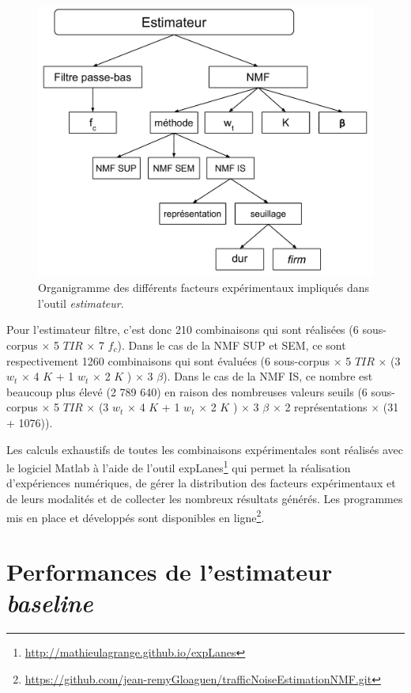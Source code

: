 \begin{figure}[h]
\centering
\includegraphics[width=0.8\linewidth]{./figures/NMF/facteurs_exp.pdf}
\caption{Organigramme des différents facteurs expérimentaux impliqués dans l'outil \textit{estimateur}.}
\label{fig:organigramme}
\end{figure}

Pour l'estimateur filtre, c'est donc 210 combinaisons qui sont réalisées (6 sous-corpus $\times$ 5 $TIR$ $\times$ 7 $f_c$). Dans le cas de la NMF SUP et SEM, ce sont respectivement 1260 combinaisons qui sont évaluées (6 sous-corpus $\times$ 5 $TIR$ $\times$ (3 $w_t$ $\times$ 4 $K$ + 1 $w_t$ $\times$ 2 $K$ ) $\times$ 3 $\beta$). Dans le cas de la NMF IS, ce nombre est beaucoup plus élevé (2 789 640) en raison des nombreuses valeurs seuils (6 sous-corpus $\times$ 5 $TIR$ $\times$ (3 $w_t$ $\times$ 4 $K$ + 1 $w_t$ $\times$ 2 $K$ ) $\times$ 3 $\beta$ $\times$ 2 représentations $\times$ (31 + 1076)).

Les calculs exhaustifs de toutes les combinaisons expérimentales sont réalisés avec le logiciel Matlab à l'aide de l'outil expLanes\footnote{\url{http://mathieulagrange.github.io/expLanes}} qui permet la réalisation d'expériences numériques, de gérer la distribution des facteurs expérimentaux et de leurs modalités et de collecter les nombreux résultats générés. Les programmes mis en place et développés sont disponibles en ligne\footnote{\url{https://github.com/jean-remyGloaguen/trafficNoiseEstimationNMF.git}}. 

\section{Performances de l'estimateur \textit{baseline}}

